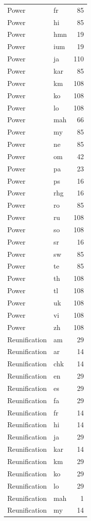 \begin{longtable}{p{3cm} p{3cm} r}
Power & fr & 85 \\
Power & hi & 85 \\
Power & hmn & 19 \\
Power & ium & 19 \\
Power & ja & 110 \\
Power & kar & 85 \\
Power & km & 108 \\
Power & ko & 108 \\
Power & lo & 108 \\
Power & mah & 66 \\
Power & my & 85 \\
Power & ne & 85 \\
Power & om & 42 \\
Power & pa & 23 \\
Power & ps & 16 \\
Power & rhg & 16 \\
Power & ro & 85 \\
Power & ru & 108 \\
Power & so & 108 \\
Power & sr & 16 \\
Power & sw & 85 \\
Power & te & 85 \\
Power & th & 108 \\
Power & tl & 108 \\
Power & uk & 108 \\
Power & vi & 108 \\
Power & zh & 108 \\
Reunification & am & 29 \\
Reunification & ar & 14 \\
Reunification & chk & 14 \\
Reunification & en & 29 \\
Reunification & es & 29 \\
Reunification & fa & 29 \\
Reunification & fr & 14 \\
Reunification & hi & 14 \\
Reunification & ja & 29 \\
Reunification & kar & 14 \\
Reunification & km & 29 \\
Reunification & ko & 29 \\
Reunification & lo & 29 \\
Reunification & mah & 1 \\
Reunification & my & 14 \\

\end{longtable}
